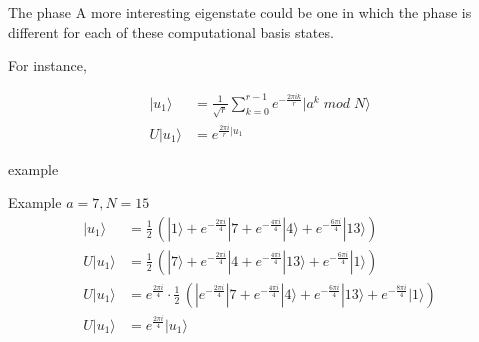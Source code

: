 \documentclass{beamer}
\begin{document}
    \begin{frame}{The phase}
        A more interesting eigenstate could be one in which the phase is different for each of these computational basis states.

        For instance,
        
        \begin{align*}
            |u_1\rangle &= \frac{1}{\sqrt{r}} \sum_{k=0}^{r-1} e^{-\frac{2 \pi i k}{r}} | a^k \; mod \; N \rangle \\
            U|u_1\rangle &= e^{\frac{2 \pi i}{r} | u_1}
        \end{align*}
    \end{frame}

    \begin{frame}{example}
        \begin{exampleblock}{Example $a = 7, N=15$}
            \begin{align*}
                |u_1\rangle &= \frac{1}{2} \, (|1\rangle + e^{-\frac{2 \pi i}{4}}|7 + e^{-\frac{4 \pi i}{4}}|4\rangle + e^{-\frac{6 \pi i}{4}}|13\rangle) \\
                U|u_1\rangle &= \frac{1}{2} \, (|7\rangle + e^{-\frac{2 \pi i}{4}}|4 + e^{-\frac{4 \pi i}{4}}|13\rangle + e^{-\frac{6 \pi i}{4}}|1\rangle) \\
                U|u_1\rangle &= e^{\frac{2 \pi i}{4}} \cdot \frac{1}{2} \, (|e^{-\frac{2 \pi i}{4}}|7 + e^{-\frac{4 \pi i}{4}}|4\rangle + e^{-\frac{6 \pi i}{4}}|13\rangle + e^{-\frac{8 \pi i}{4}}|1\rangle) \\
                U|u_1\rangle &= e^{\frac{2 \pi i}{4}}|u_1\rangle
            \end{align*}
        \end{exampleblock}
    \end{frame}

    
    
\end{document}
